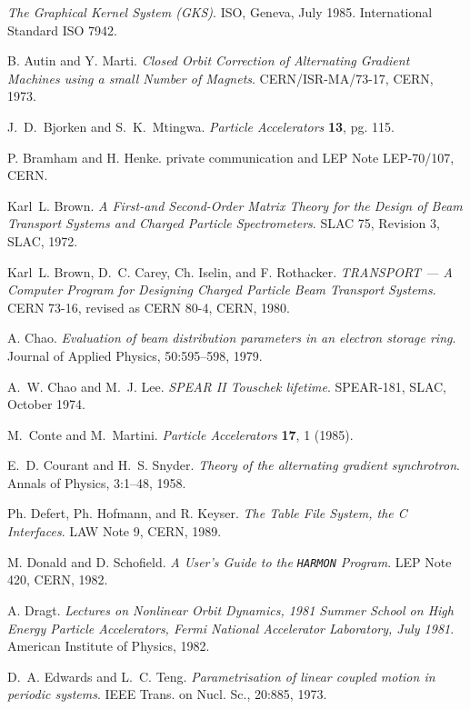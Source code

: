 \clearpage
\begin{thebibliography}{10}
 
{\sl The Graphical Kernel System (GKS)}.
ISO, Geneva, July 1985.
International Standard ISO 7942.
 
B. Autin and Y. Marti.
{\sl Closed Orbit Correction of Alternating Gradient Machines
  using a small Number of Magnets}.
CERN/ISR-MA/73-17, CERN, 1973.
 
J.~D.~Bjorken and S.~K.~Mtingwa.
{\sl Particle Accelerators} {\bf 13}, pg. 115.
 
P. Bramham and H. Henke.
private communication and LEP Note LEP-70/107, CERN.
 
Karl~L. Brown.
{\sl A First-and Second-Order Matrix Theory for the Design
  of Beam Transport Systems and Charged Particle Spectrometers}.
SLAC 75, Revision 3, SLAC, 1972.
 
Karl~L. Brown, D.~C. Carey, Ch. Iselin, and F. Rothacker.
{\sl TRANSPORT --- A Computer Program for Designing Charged
  Particle Beam Transport Systems}.
CERN 73-16, revised as CERN 80-4, CERN, 1980.
 
A. Chao.
{\sl Evaluation of beam distribution parameters in an electron
  storage ring}.
Journal of Applied Physics, 50:595--598, 1979.
 
A.~W. Chao and M.~J. Lee.
{\sl SPEAR II Touschek lifetime}.
SPEAR-181, SLAC, October 1974.
 
M.~Conte and M.~Martini.
{\sl Particle Accelerators} {\bf 17}, 1 (1985).
 
E.~D. Courant and H.~S. Snyder.
{\sl Theory of the alternating gradient synchrotron}.
Annals of Physics, 3:1--48, 1958.
 
Ph. Defert, Ph. Hofmann, and R. Keyser.
{\sl The Table File System, the C Interfaces}.
LAW Note 9, CERN, 1989.
 
M. Donald and D. Schofield.
{\sl A User's Guide to the {\tt HARMON} Program}.
LEP Note 420, CERN, 1982.
 
A. Dragt.
{\sl Lectures on Nonlinear Orbit Dynamics, 1981 Summer School on High
  Energy Particle Accelerators, Fermi National Accelerator Laboratory, July
  1981}.
American Institute of Physics, 1982.
 
D.~A. Edwards and L.~C. Teng.
{\sl Parametrisation of linear coupled motion in periodic systems}.
IEEE Trans. on Nucl. Sc., 20:885, 1973.
 

\end{thebibliography}
